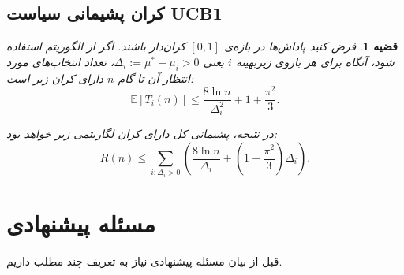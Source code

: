 \documentclass[a4paper,10pt,twocolumn]{article}
\newtheorem{theorem}{قضیه}[section]
\begin{document}
\subsection{کران پشیمانی سیاست UCB1}

\begin{theorem}
فرض کنید پاداش‌ها در بازه‌ی $[0,1]$ کران‌دار باشند.
اگر از الگوریتم  استفاده شود، آنگاه برای هر بازوی زیر‌بهینه
$i$ یعنی 
$\Delta_i := \mu^\ast - \mu_i > 0$،
تعداد انتخاب‌های مورد انتظار آن تا گام $n$ دارای کران زیر است:
\[
\mathbb{E}[T_i(n)]
\le
\frac{8 \ln n}{\Delta_i^2}
+ 1 + \frac{\pi^2}{3}.
\]

در نتیجه، پشیمانی کل دارای کران لگاریتمی زیر خواهد بود:
\[
R(n)
\le
\sum_{i:\Delta_i>0}
\left(
\frac{8 \ln n}{\Delta_i}
+
\left(1+\frac{\pi^2}{3}\right)\Delta_i
\right).
\]
\end{theorem}



\section{مسئله پیشنهادی}
قبل از بیان مسئله پیشنهادی نیاز به تعریف چند مطلب داریم.



\end{document}
